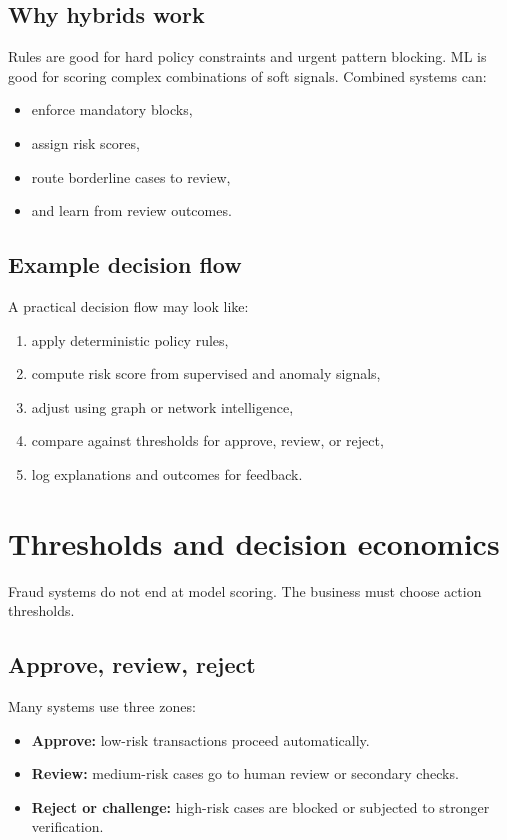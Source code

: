 \subsection{Why hybrids work}
Rules are good for hard policy constraints and urgent pattern blocking.
ML is good for scoring complex combinations of soft signals.
Combined systems can:
\begin{itemize}
  \item enforce mandatory blocks,
  \item assign risk scores,
  \item route borderline cases to review,
  \item and learn from review outcomes.
\end{itemize}

\subsection{Example decision flow}
A practical decision flow may look like:
\begin{enumerate}
  \item apply deterministic policy rules,
  \item compute risk score from supervised and anomaly signals,
  \item adjust using graph or network intelligence,
  \item compare against thresholds for approve, review, or reject,
  \item log explanations and outcomes for feedback.
\end{enumerate}

\section{Thresholds and decision economics}
Fraud systems do not end at model scoring.
The business must choose action thresholds.

\subsection{Approve, review, reject}
Many systems use three zones:
\begin{itemize}
  \item \textbf{Approve:} low-risk transactions proceed automatically.
  \item \textbf{Review:} medium-risk cases go to human review or secondary checks.
  \item \textbf{Reject or challenge:} high-risk cases are blocked or subjected to stronger verification.
\end{itemize}

